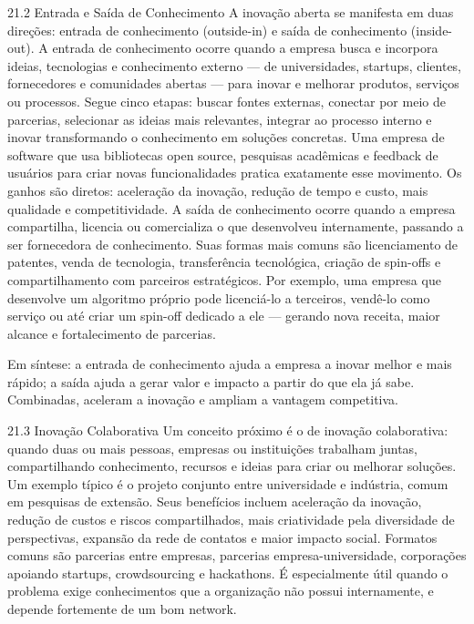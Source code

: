 21.2 Entrada e Saída de Conhecimento A inovação aberta se manifesta em duas direções: entrada de conhecimento (outside-in) e saída de conhecimento (inside-out). A entrada de conhecimento ocorre quando a empresa busca e incorpora ideias, tecnologias e conhecimento externo — de universidades, startups, clientes, fornecedores e comunidades abertas — para inovar e melhorar produtos, serviços ou processos. Segue cinco etapas: buscar fontes externas, conectar por meio de parcerias, selecionar as ideias mais relevantes, integrar ao processo interno e inovar transformando o conhecimento em soluções concretas. Uma empresa de software que usa bibliotecas open source, pesquisas acadêmicas e feedback de usuários para criar novas funcionalidades pratica exatamente esse movimento. Os ganhos são diretos: aceleração da inovação, redução de tempo e custo, mais qualidade e competitividade. A saída de conhecimento ocorre quando a empresa compartilha, licencia ou comercializa o que desenvolveu internamente, passando a ser fornecedora de conhecimento. Suas formas mais comuns são licenciamento de patentes, venda de tecnologia, transferência tecnológica, criação de spin-offs e compartilhamento com parceiros estratégicos. Por exemplo, uma empresa que desenvolve um algoritmo próprio pode licenciá-lo a terceiros, vendê-lo como serviço ou até criar um spin-off dedicado a ele — gerando nova receita, maior alcance e fortalecimento de parcerias.

Em síntese: a entrada de conhecimento ajuda a empresa a inovar melhor e mais rápido; a saída ajuda a gerar valor e impacto a partir do que ela já sabe. Combinadas, aceleram a inovação e ampliam a vantagem competitiva.

21.3 Inovação Colaborativa Um conceito próximo é o de inovação colaborativa: quando duas ou mais pessoas, empresas ou instituições trabalham juntas, compartilhando conhecimento, recursos e ideias para criar ou melhorar soluções. Um exemplo típico é o projeto conjunto entre universidade e indústria, comum em pesquisas de extensão. Seus benefícios incluem aceleração da inovação, redução de custos e riscos compartilhados, mais criatividade pela diversidade de perspectivas, expansão da rede de contatos e maior impacto social. Formatos comuns são parcerias entre empresas, parcerias empresa-universidade, corporações apoiando startups, crowdsourcing e hackathons. É especialmente útil quando o problema exige conhecimentos que a organização não possui internamente, e depende fortemente de um bom network.


